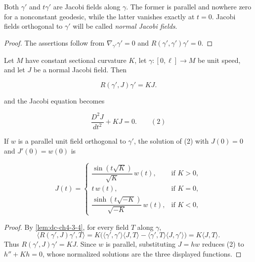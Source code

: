 \begin{remark}
  \label{rem:dc-ch5-2-2}
  \leanok
  Both $\gamma'$ and $t\gamma'$ are Jacobi fields along $\gamma$. The former is
  parallel and nowhere zero for a nonconstant geodesic, while the latter
  vanishes exactly at $t=0$. Jacobi fields orthogonal to $\gamma'$ will be called
  \emph{normal Jacobi fields}.
\end{remark}
\begin{proof}

  \sketch
  The assertions follow from $\nabla_{\gamma'}\gamma'=0$ and
  $R(\gamma',\gamma')\gamma'=0$.
\end{proof}

\begin{example}
  \label{ex:dc-ch5-2-3}
  \leanok
  Let $M$ have constant sectional curvature $K$, let
  $\gamma:[0,\ell]\to M$ be unit speed, and let $J$ be a normal Jacobi field.
  Then
  
  $$
  R(\gamma',J)\gamma'=KJ.
  $$
  
  and the Jacobi equation becomes

  $$
  \frac{D^2 J}{dt^2}+KJ=0.\qquad(2)
  $$

  If $w$ is a parallel unit field orthogonal to $\gamma'$, the solution of (2)
  with $J(0)=0$ and $J'(0)=w(0)$ is
  
  $$
  J(t)=\begin{cases}\dfrac{\sin(t\sqrt{K})}{\sqrt{K}}\,w(t),&\text{if }K>0,\\[1ex] t\,w(t),&\text{if }K=0,\\[1ex]\dfrac{\sinh(t\sqrt{-K})}{\sqrt{-K}}\,w(t),&\text{if }K<0,\end{cases}
  $$
\end{example}
\begin{proof}
  

  \sketch
  By \cref{lem:dc-ch4-3-4}, for every field $T$ along $\gamma$,
  $$
  \langle R(\gamma',J)\gamma',T\rangle
  =K\big(\langle\gamma',\gamma'\rangle\langle J,T\rangle
  -\langle\gamma',T\rangle\langle J,\gamma'\rangle\big)
  =K\langle J,T\rangle.
  $$
  Thus $R(\gamma',J)\gamma'=KJ$. Since $w$ is parallel, substituting
  $J=h w$ reduces (2) to $h''+Kh=0$, whose normalized solutions are the three
  displayed functions.
\end{proof}

